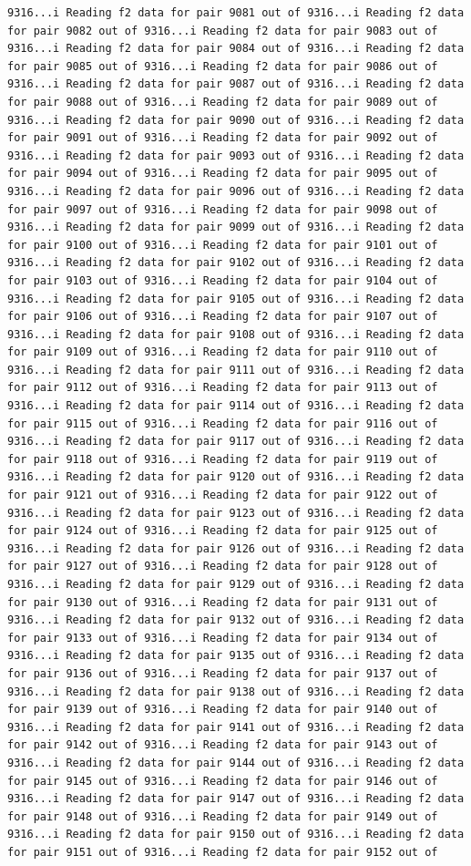 \documentclass[
]{article}
\begin{document}
\begin{verbatim}
9316...i Reading f2 data for pair 9081 out of 9316...i Reading f2 data for pair 9082 out of 9316...i Reading f2 data for pair 9083 out of 9316...i Reading f2 data for pair 9084 out of 9316...i Reading f2 data for pair 9085 out of 9316...i Reading f2 data for pair 9086 out of 9316...i Reading f2 data for pair 9087 out of 9316...i Reading f2 data for pair 9088 out of 9316...i Reading f2 data for pair 9089 out of 9316...i Reading f2 data for pair 9090 out of 9316...i Reading f2 data for pair 9091 out of 9316...i Reading f2 data for pair 9092 out of 9316...i Reading f2 data for pair 9093 out of 9316...i Reading f2 data for pair 9094 out of 9316...i Reading f2 data for pair 9095 out of 9316...i Reading f2 data for pair 9096 out of 9316...i Reading f2 data for pair 9097 out of 9316...i Reading f2 data for pair 9098 out of 9316...i Reading f2 data for pair 9099 out of 9316...i Reading f2 data for pair 9100 out of 9316...i Reading f2 data for pair 9101 out of 9316...i Reading f2 data for pair 9102 out of 9316...i Reading f2 data for pair 9103 out of 9316...i Reading f2 data for pair 9104 out of 9316...i Reading f2 data for pair 9105 out of 9316...i Reading f2 data for pair 9106 out of 9316...i Reading f2 data for pair 9107 out of 9316...i Reading f2 data for pair 9108 out of 9316...i Reading f2 data for pair 9109 out of 9316...i Reading f2 data for pair 9110 out of 9316...i Reading f2 data for pair 9111 out of 9316...i Reading f2 data for pair 9112 out of 9316...i Reading f2 data for pair 9113 out of 9316...i Reading f2 data for pair 9114 out of 9316...i Reading f2 data for pair 9115 out of 9316...i Reading f2 data for pair 9116 out of 9316...i Reading f2 data for pair 9117 out of 9316...i Reading f2 data for pair 9118 out of 9316...i Reading f2 data for pair 9119 out of 9316...i Reading f2 data for pair 9120 out of 9316...i Reading f2 data for pair 9121 out of 9316...i Reading f2 data for pair 9122 out of 9316...i Reading f2 data for pair 9123 out of 9316...i Reading f2 data for pair 9124 out of 9316...i Reading f2 data for pair 9125 out of 9316...i Reading f2 data for pair 9126 out of 9316...i Reading f2 data for pair 9127 out of 9316...i Reading f2 data for pair 9128 out of 9316...i Reading f2 data for pair 9129 out of 9316...i Reading f2 data for pair 9130 out of 9316...i Reading f2 data for pair 9131 out of 9316...i Reading f2 data for pair 9132 out of 9316...i Reading f2 data for pair 9133 out of 9316...i Reading f2 data for pair 9134 out of 9316...i Reading f2 data for pair 9135 out of 9316...i Reading f2 data for pair 9136 out of 9316...i Reading f2 data for pair 9137 out of 9316...i Reading f2 data for pair 9138 out of 9316...i Reading f2 data for pair 9139 out of 9316...i Reading f2 data for pair 9140 out of 9316...i Reading f2 data for pair 9141 out of 9316...i Reading f2 data for pair 9142 out of 9316...i Reading f2 data for pair 9143 out of 9316...i Reading f2 data for pair 9144 out of 9316...i Reading f2 data for pair 9145 out of 9316...i Reading f2 data for pair 9146 out of 9316...i Reading f2 data for pair 9147 out of 9316...i Reading f2 data for pair 9148 out of 9316...i Reading f2 data for pair 9149 out of 9316...i Reading f2 data for pair 9150 out of 9316...i Reading f2 data for pair 9151 out of 9316...i Reading f2 data for pair 9152 out of 
\end{verbatim}
\end{document}
